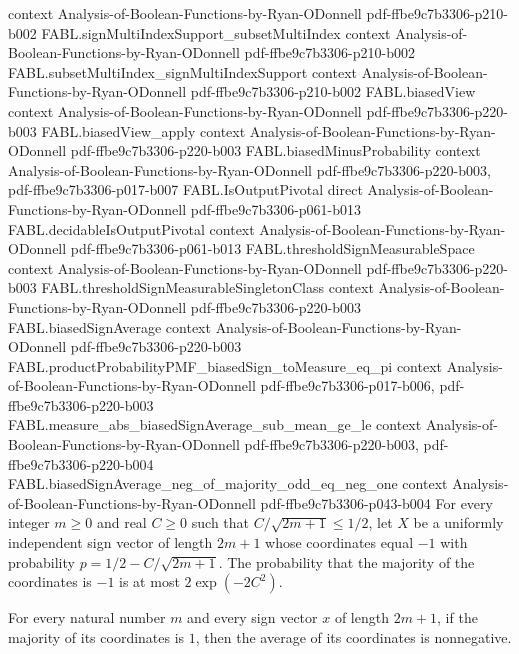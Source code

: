 \begin{theorem}
  {context}
  {Analysis-of-Boolean-Functions-by-Ryan-ODonnell}
  {pdf-ffbe9c7b3306-p210-b002}
\proofstep
  {FABL.signMultiIndexSupport_subsetMultiIndex}
  {context}
  {Analysis-of-Boolean-Functions-by-Ryan-ODonnell}
  {pdf-ffbe9c7b3306-p210-b002}
\proofstep
  {FABL.subsetMultiIndex_signMultiIndexSupport}
  {context}
  {Analysis-of-Boolean-Functions-by-Ryan-ODonnell}
  {pdf-ffbe9c7b3306-p210-b002}
\proofstep
  {FABL.biasedView}
  {context}
  {Analysis-of-Boolean-Functions-by-Ryan-ODonnell}
  {pdf-ffbe9c7b3306-p220-b003}
\proofstep
  {FABL.biasedView_apply}
  {context}
  {Analysis-of-Boolean-Functions-by-Ryan-ODonnell}
  {pdf-ffbe9c7b3306-p220-b003}
\proofstep
  {FABL.biasedMinusProbability}
  {context}
  {Analysis-of-Boolean-Functions-by-Ryan-ODonnell}
  {pdf-ffbe9c7b3306-p220-b003,
    pdf-ffbe9c7b3306-p017-b007}
\proofstep
  {FABL.IsOutputPivotal}
  {direct}
  {Analysis-of-Boolean-Functions-by-Ryan-ODonnell}
  {pdf-ffbe9c7b3306-p061-b013}
\proofstep
  {FABL.decidableIsOutputPivotal}
  {context}
  {Analysis-of-Boolean-Functions-by-Ryan-ODonnell}
  {pdf-ffbe9c7b3306-p061-b013}
\proofstep
  {FABL.thresholdSignMeasurableSpace}
  {context}
  {Analysis-of-Boolean-Functions-by-Ryan-ODonnell}
  {pdf-ffbe9c7b3306-p220-b003}
\proofstep
  {FABL.thresholdSignMeasurableSingletonClass}
  {context}
  {Analysis-of-Boolean-Functions-by-Ryan-ODonnell}
  {pdf-ffbe9c7b3306-p220-b003}
\proofstep
  {FABL.biasedSignAverage}
  {context}
  {Analysis-of-Boolean-Functions-by-Ryan-ODonnell}
  {pdf-ffbe9c7b3306-p220-b003}
\proofstep
  {FABL.productProbabilityPMF_biasedSign_toMeasure_eq_pi}
  {context}
  {Analysis-of-Boolean-Functions-by-Ryan-ODonnell}
  {pdf-ffbe9c7b3306-p017-b006,
    pdf-ffbe9c7b3306-p220-b003}
\proofstep
  {FABL.measure_abs_biasedSignAverage_sub_mean_ge_le}
  {context}
  {Analysis-of-Boolean-Functions-by-Ryan-ODonnell}
  {pdf-ffbe9c7b3306-p220-b003,
    pdf-ffbe9c7b3306-p220-b004}
\proofstep
  {FABL.biasedSignAverage_neg_of_majority_odd_eq_neg_one}
  {context}
  {Analysis-of-Boolean-Functions-by-Ryan-ODonnell}
  {pdf-ffbe9c7b3306-p043-b004}
For every integer $m\ge 0$ and real $C\ge 0$ such that $C/\sqrt{2m+1}\le 1/2$, let $X$
be a uniformly independent sign vector of length $2m+1$ whose coordinates equal $-1$
with probability $p=1/2-C/\sqrt{2m+1}$. The probability that the majority of the
coordinates is $-1$ is at most $2\exp(-2C^2)$.
\end{theorem}

\begin{theorem}
\label{FABL.biasedSignAverage_nonneg_of_majority_odd_eq_one}
\leanok
{}
For every natural number $m$ and every sign vector $x$ of length $2m+1$, if the majority
of its coordinates is $1$, then the average of its coordinates is nonnegative.
\end{theorem}

